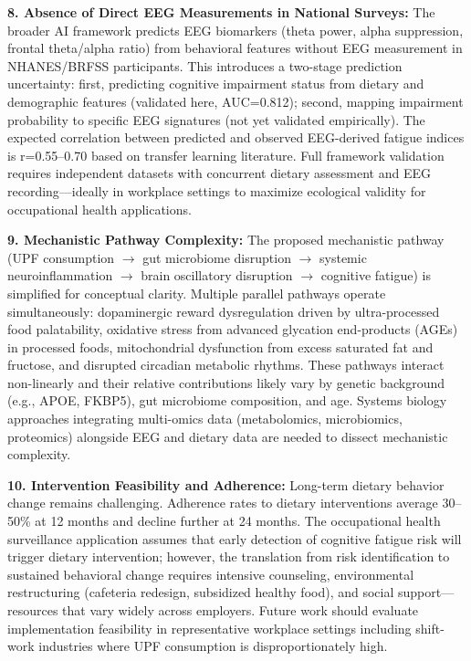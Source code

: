 \documentclass[journal,twoside,10pt]{IEEEtran}
\begin{document}
\textbf{8. Absence of Direct EEG Measurements in National Surveys:}
The broader AI framework predicts EEG biomarkers (theta power, alpha suppression, frontal theta/alpha ratio) from behavioral features without EEG measurement in NHANES/BRFSS participants. This introduces a two-stage prediction uncertainty: first, predicting cognitive impairment status from dietary and demographic features (validated here, AUC=0.812); second, mapping impairment probability to specific EEG signatures (not yet validated empirically). The expected correlation between predicted and observed EEG-derived fatigue indices is r=0.55--0.70 based on transfer learning literature. Full framework validation requires independent datasets with concurrent dietary assessment and EEG recording---ideally in workplace settings to maximize ecological validity for occupational health applications.

\textbf{9. Mechanistic Pathway Complexity:}
The proposed mechanistic pathway (UPF consumption $\rightarrow$ gut microbiome disruption $\rightarrow$ systemic neuroinflammation $\rightarrow$ brain oscillatory disruption $\rightarrow$ cognitive fatigue) is simplified for conceptual clarity. Multiple parallel pathways operate simultaneously: dopaminergic reward dysregulation driven by ultra-processed food palatability, oxidative stress from advanced glycation end-products (AGEs) in processed foods, mitochondrial dysfunction from excess saturated fat and fructose, and disrupted circadian metabolic rhythms. These pathways interact non-linearly and their relative contributions likely vary by genetic background (e.g., APOE, FKBP5), gut microbiome composition, and age. Systems biology approaches integrating multi-omics data (metabolomics, microbiomics, proteomics) alongside EEG and dietary data are needed to dissect mechanistic complexity.

\textbf{10. Intervention Feasibility and Adherence:}
Long-term dietary behavior change remains challenging. Adherence rates to dietary interventions average 30--50\% at 12 months and decline further at 24 months. The occupational health surveillance application assumes that early detection of cognitive fatigue risk will trigger dietary intervention; however, the translation from risk identification to sustained behavioral change requires intensive counseling, environmental restructuring (cafeteria redesign, subsidized healthy food), and social support---resources that vary widely across employers. Future work should evaluate implementation feasibility in representative workplace settings including shift-work industries where UPF consumption is disproportionately high.
\end{document}

